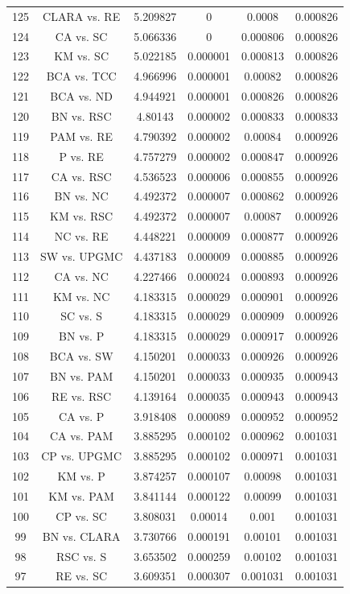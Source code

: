 \documentclass[a4paper,10pt]{article}
\begin{document}
\begin{landscape}
\begin{table}[!htp]
\begin{tabular}{cccccc}
125&CLARA vs. RE&5.209827&0&0.0008&0.000826\\
124&CA vs. SC&5.066336&0&0.000806&0.000826\\
123&KM vs. SC&5.022185&0.000001&0.000813&0.000826\\
122&BCA vs. TCC&4.966996&0.000001&0.00082&0.000826\\
121&BCA vs. ND&4.944921&0.000001&0.000826&0.000826\\
120&BN vs. RSC&4.80143&0.000002&0.000833&0.000833\\
119&PAM vs. RE&4.790392&0.000002&0.00084&0.000926\\
118&P vs. RE&4.757279&0.000002&0.000847&0.000926\\
117&CA vs. RSC&4.536523&0.000006&0.000855&0.000926\\
116&BN vs. NC&4.492372&0.000007&0.000862&0.000926\\
115&KM vs. RSC&4.492372&0.000007&0.00087&0.000926\\
114&NC vs. RE&4.448221&0.000009&0.000877&0.000926\\
113&SW vs. UPGMC&4.437183&0.000009&0.000885&0.000926\\
112&CA vs. NC&4.227466&0.000024&0.000893&0.000926\\
111&KM vs. NC&4.183315&0.000029&0.000901&0.000926\\
110&SC vs. S&4.183315&0.000029&0.000909&0.000926\\
109&BN vs. P&4.183315&0.000029&0.000917&0.000926\\
108&BCA vs. SW&4.150201&0.000033&0.000926&0.000926\\
107&BN vs. PAM&4.150201&0.000033&0.000935&0.000943\\
106&RE vs. RSC&4.139164&0.000035&0.000943&0.000943\\
105&CA vs. P&3.918408&0.000089&0.000952&0.000952\\
104&CA vs. PAM&3.885295&0.000102&0.000962&0.001031\\
103&CP vs. UPGMC&3.885295&0.000102&0.000971&0.001031\\
102&KM vs. P&3.874257&0.000107&0.00098&0.001031\\
101&KM vs. PAM&3.841144&0.000122&0.00099&0.001031\\
100&CP vs. SC&3.808031&0.00014&0.001&0.001031\\
99&BN vs. CLARA&3.730766&0.000191&0.00101&0.001031\\
98&RSC vs. S&3.653502&0.000259&0.00102&0.001031\\
97&RE vs. SC&3.609351&0.000307&0.001031&0.001031\\

\end{tabular}
\end{table}
\end{landscape}
\end{document}
